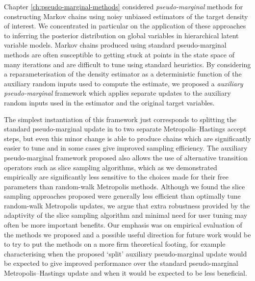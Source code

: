 Chapter \ref{ch:pseudo-marginal-methods} considered \emph{pseudo-marginal} methods for constructing Markov chains using noisy unbiased estimators of the target density of interest. We concentrated in particular on the application of these approaches to inferring the posterior distribution on global variables in hierarchical latent variable models. Markov chains produced using standard pseudo-marginal methods are often susceptible to getting stuck at points in the state space of many iterations and are difficult to tune using standard heuristics. By considering a reparameterisation of the density estimator as a deterministic function of the auxiliary random inputs used to compute the estimate, we proposed a \emph{auxiliary pseudo-marginal} framework which applies separate updates to the auxiliary random inputs used in the estimator and the original target variables. 

The simplest instantiation of this framework just corresponds to splitting the standard pseudo-marginal update in to two separate Metropolis--Hastings accept steps, but even this minor change is able to produce chains which are significantly easier to tune and in some cases give improved sampling efficiency. The auxiliary pseudo-marginal framework proposed also allows the use of alternative transition operators such as slice sampling algorithms, which as we demonstrated empirically are significantly less sensitive to the choices made for their free parameters than random-walk Metropolis methods. Although we found the slice sampling approaches proposed were generally less efficient than optimally tune random-walk Metropolis updates, we argue that extra robustness provided by the adaptivity of the slice sampling algorithm and minimal need for user tuning may often be more important benefits. Our emphasis was on empirical evaluation of the methods we proposed and a possible useful direction for future work would be to try to put the methods on a more firm theoretical footing, for example characterising when the proposed `split' auxiliary pseudo-marginal update would be expected to give improved performance over the standard pseudo-marginal Metropolis--Hastings update and when it would be expected to be less beneficial.

